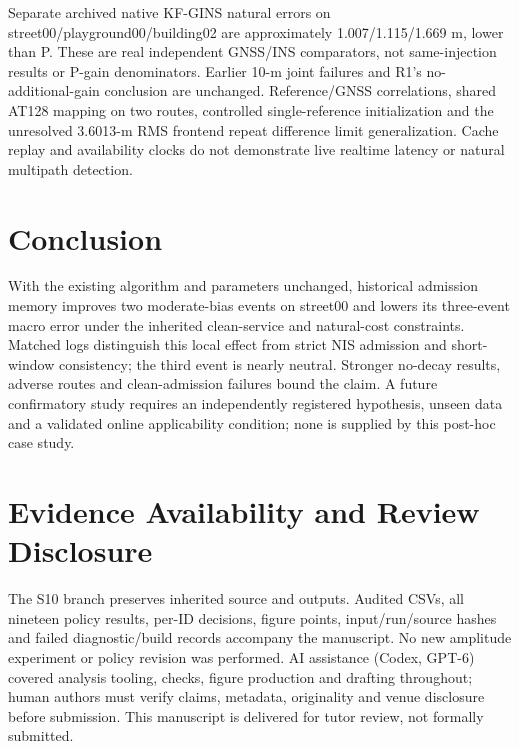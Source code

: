 \documentclass[conference]{IEEEtran}
\begin{document}
Separate archived native KF-GINS natural errors on street00/playground00/building02 are approximately 1.007/1.115/1.669 m, lower than P. These are real independent GNSS/INS comparators, not same-injection results or P-gain denominators. Earlier 10-m joint failures and R1's no-additional-gain conclusion are unchanged. Reference/GNSS correlations, shared AT128 mapping on two routes, controlled single-reference initialization and the unresolved 3.6013-m RMS frontend repeat difference limit generalization. Cache replay and availability clocks do not demonstrate live realtime latency or natural multipath detection.

\section{Conclusion}
With the existing algorithm and parameters unchanged, historical admission memory improves two moderate-bias events on street00 and lowers its three-event macro error under the inherited clean-service and natural-cost constraints. Matched logs distinguish this local effect from strict NIS admission and short-window consistency; the third event is nearly neutral. Stronger no-decay results, adverse routes and clean-admission failures bound the claim. A future confirmatory study requires an independently registered hypothesis, unseen data and a validated online applicability condition; none is supplied by this post-hoc case study.

\section*{Evidence Availability and Review Disclosure}
The S10 branch preserves inherited source and outputs. Audited CSVs, all nineteen policy results, per-ID decisions, figure points, input/run/source hashes and failed diagnostic/build records accompany the manuscript. No new amplitude experiment or policy revision was performed. AI assistance (Codex, GPT-6) covered analysis tooling, checks, figure production and drafting throughout; human authors must verify claims, metadata, originality and venue disclosure before submission. This manuscript is delivered for tutor review, not formally submitted.


\end{document}
